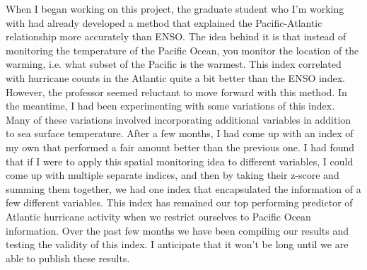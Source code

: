 \documentclass[a4paper,12pt]{article}
\newcommand{\tab}{\hspace*{2em}}
\begin{document}
\tab When I began working on this project, the graduate student who I'm working with had already developed a method that explained the Pacific-Atlantic relationship more accurately than ENSO.  The idea behind it is that instead of monitoring the temperature of the Pacific Ocean, you monitor the location of the warming, i.e. what subset of the Pacific is the warmest.  This index correlated with hurricane counts in the Atlantic quite a bit better than the ENSO index.  However, the professor seemed reluctant to move forward with this method.  In the meantime, I had been experimenting with some variations of this index.  Many of these variations involved incorporating additional variables in addition to sea surface temperature.  After a few months, I had come up with an index of my own that performed a fair amount better than the previous one.  I had found that if I were to apply this spatial monitoring idea to different variables, I could come up with multiple separate indices, and then by taking their z-score and summing them together, we had one index that encapsulated the information of a few different variables.  This index has remained our top performing predictor of Atlantic hurricane activity when we restrict ourselves to Pacific Ocean information.  Over the past few months we have been compiling our results and testing the validity of this index.  I anticipate that it won't be long until we are able to publish these results.
\end{document}
